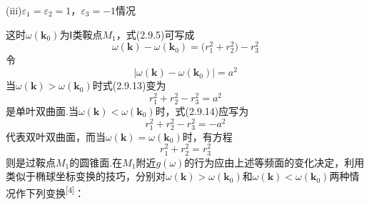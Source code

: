 (iii)$\varepsilon_1=\varepsilon_2=1$，$\varepsilon_3=-1$情况

这时$\omega(\boldsymbol{k}_0)$为Ⅰ类鞍点$M_1$，式(2.9.5)可写成
\begin{equation}
  \omega(\boldsymbol{k})-\omega(\boldsymbol{k}_0)
  =\bigl(r_1^2+r_2^2\bigr)-r_3^2
\end{equation}
令
\begin{equation}
  \bigl|\omega(\boldsymbol{k})-\omega(\boldsymbol{k}_0)\bigr|=a^2
\end{equation}
当$\omega(\boldsymbol{k})>\omega(\boldsymbol{k}_0)$时式(2.9.13)变为
\begin{equation}
  r_1^2+r_2^2-r_3^2=a^2
\end{equation}
是单叶双曲面.当$\omega(\boldsymbol{k})<\omega(\boldsymbol{k}_0)$时，式(2.9.14)应写为
\begin{equation}
  r_1^2+r_2^2-r_3^2=-a^2
\end{equation}
代表双叶双曲面，而当$\omega(\boldsymbol{k})=\omega(\boldsymbol{k}_0)$时，有方程
\begin{equation}
  r_1^2+r_2^2=r_3^2
\end{equation}
则是过鞍点$M_1$的圆锥面.在$M_1$附近$g(\omega)$的行为应由上述等频面的变化决定，利用类似于椭球坐标变换的技巧，分别对$\omega(\boldsymbol{k})>\omega(\boldsymbol{k}_0)$和$\omega(\boldsymbol{k})<\omega(\boldsymbol{k}_0)$两种情况作下列变换\textsuperscript{[4]}：

